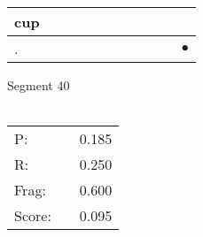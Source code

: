 \documentclass[landscape]{article}
\newcommand{\ssp}{\hspace{2pt}}
\newcommand{\mex}{\cellcolor{g}$\bullet$}
\begin{document}
\begin{tabular}{|l|p{10pt}|p{10pt}|p{10pt}|p{10pt}|p{10pt}|p{10pt}|p{10pt}|p{10pt}|p{10pt}|p{10pt}|}
\hline
\ssp cup \ssp&\hspace{2pt}&\hspace{2pt}&\hspace{2pt}&\hspace{2pt}&\hspace{2pt}&\hspace{2pt}&\hspace{2pt}&\hspace{2pt}&\hspace{2pt}&\hspace{2pt}\\
\hline
\ssp \cellcolor{ref9}. \ssp&\hspace{2pt}&\hspace{2pt}&\hspace{2pt}&\hspace{2pt}&\hspace{2pt}&\hspace{2pt}&\hspace{2pt}&\hspace{2pt}&\hspace{2pt}&\hspace{2pt}\mex\\
\hline
\end{tabular}

\vspace{6pt}
\noindent Segment 40\\\\
\noindent\begin{tabular}{lm{12pt}r}
\hline
P:&&0.185\\
R:&&0.250\\
Frag:&&0.600\\
Score:&&0.095\\
\end{tabular}

\newpage
\end{document}
